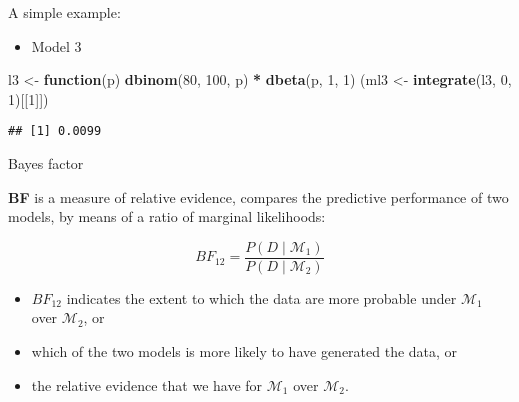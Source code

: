 \documentclass[12pt,ignorenonframetext,aspectratio=169]{beamer}
\newenvironment{Shaded}{\begin{snugshade}}{\end{snugshade}}
\newcommand{\ControlFlowTok}[1]{\textcolor[rgb]{0.13,0.29,0.53}{\textbf{#1}}}
\newcommand{\DecValTok}[1]{\textcolor[rgb]{0.00,0.00,0.81}{#1}}
\newcommand{\KeywordTok}[1]{\textcolor[rgb]{0.13,0.29,0.53}{\textbf{#1}}}
\newcommand{\NormalTok}[1]{#1}
\newcommand{\OperatorTok}[1]{\textcolor[rgb]{0.81,0.36,0.00}{\textbf{#1}}}
\newcommand{\StringTok}[1]{\textcolor[rgb]{0.31,0.60,0.02}{#1}}
\providecommand{\tightlist}{%
  \setlength{\itemsep}{0pt}\setlength{\parskip}{0pt}}
\begin{document}
\begin{frame}[fragile]{A simple example:}
\protect\hypertarget{a-simple-example-2}{}

\begin{itemize}
\tightlist
\item
  Model 3
\end{itemize}

\begin{Shaded}
\begin{Highlighting}[]
\NormalTok{l3 <-}\StringTok{ }\ControlFlowTok{function}\NormalTok{(p) }\KeywordTok{dbinom}\NormalTok{(}\DecValTok{80}\NormalTok{, }\DecValTok{100}\NormalTok{, p) }\OperatorTok{*}\StringTok{ }\KeywordTok{dbeta}\NormalTok{(p, }\DecValTok{1}\NormalTok{, }\DecValTok{1}\NormalTok{)}
\NormalTok{(ml3 <-}\StringTok{ }\KeywordTok{integrate}\NormalTok{(l3, }\DecValTok{0}\NormalTok{, }\DecValTok{1}\NormalTok{)[[}\DecValTok{1}\NormalTok{]])}
\end{Highlighting}
\end{Shaded}

\begin{verbatim}
## [1] 0.0099
\end{verbatim}

\end{frame}

\begin{frame}{Bayes factor}
\protect\hypertarget{bayes-factor}{}

\textbf{BF} is a measure of relative evidence, compares the predictive performance of two models, by means of a ratio of marginal likelihoods:

\begin{equation}
BF_{12} = \frac{P(D\mid \mathcal{M}_1)}{P(D\mid \mathcal{M}_2)}
\end{equation}

\begin{itemize}
\item
  \(BF_{12}\) indicates the extent to which the data are more probable under \(\mathcal{M}_1\) over \(\mathcal{M}_2\), or
\item
  which of the two models is more likely to have generated the data, or
\item
  the relative evidence that we have for \(\mathcal{M}_1\) over \(\mathcal{M}_2\).
\end{itemize}

\end{frame}
\end{document}
